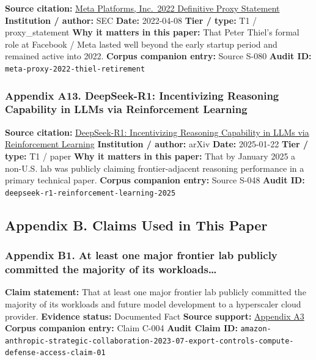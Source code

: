 \documentclass[
  american,
  11pt,
  letterpaper,
]{article}
\begin{document}
\textbf{Source citation:}
\href{https://www.sec.gov/Archives/edgar/data/1326801/000132680122000043/meta2022definitiveproxysta.htm}{Meta
Platforms, Inc.~2022 Definitive Proxy Statement} \textbf{Institution /
author:} SEC \textbf{Date:} 2022-04-08 \textbf{Tier / type:} T1 /
proxy\_statement \textbf{Why it matters in this paper:} That Peter
Thiel's formal role at Facebook / Meta lasted well beyond the early
startup period and remained active into 2022. \textbf{Corpus companion
entry:} Source S-080 \textbf{Audit ID:}
\texttt{meta-proxy-2022-thiel-retirement}

\subsubsection{Appendix A13. DeepSeek-R1: Incentivizing Reasoning
Capability in LLMs via Reinforcement
Learning}\label{ch-07-appendix-a13-deepseek-r1-incentivizing-reasoning-capability-in-llms-via-reinforcement-learning}

\textbf{Source citation:}
\href{https://arxiv.org/abs/2501.12948}{DeepSeek-R1: Incentivizing
Reasoning Capability in LLMs via Reinforcement Learning}
\textbf{Institution / author:} arXiv \textbf{Date:} 2025-01-22
\textbf{Tier / type:} T1 / paper \textbf{Why it matters in this paper:}
That by January 2025 a non-U.S. lab was publicly claiming
frontier-adjacent reasoning performance in a primary technical paper.
\textbf{Corpus companion entry:} Source S-048 \textbf{Audit ID:}
\texttt{deepseek-r1-reinforcement-learning-2025}

\subsection{Appendix B. Claims Used in This
Paper}\label{appendix-b.-claims-used-in-this-paper-7}

\subsubsection{Appendix B1. At least one major frontier lab publicly
committed the majority of its
workloads\ldots{}}\label{ch-07-appendix-b1-at-least-one-major-frontier-lab-publicly-committed-the-majority-of-its-workloads}

\textbf{Claim statement:} That at least one major frontier lab publicly
committed the majority of its workloads and future model development to
a hyperscaler cloud provider. \textbf{Evidence status:} Documented Fact
\textbf{Source support:}
\hyperref[ch-07-appendix-a3-amazon-and-anthropic-announce-strategic-collaboration-to-advance-generative-ai]{Appendix
A3} \textbf{Corpus companion entry:} Claim C-004 \textbf{Audit Claim
ID:}
\texttt{amazon-anthropic-strategic-collaboration-2023-07-export-controls-compute-defense-access-claim-01}
\end{document}
